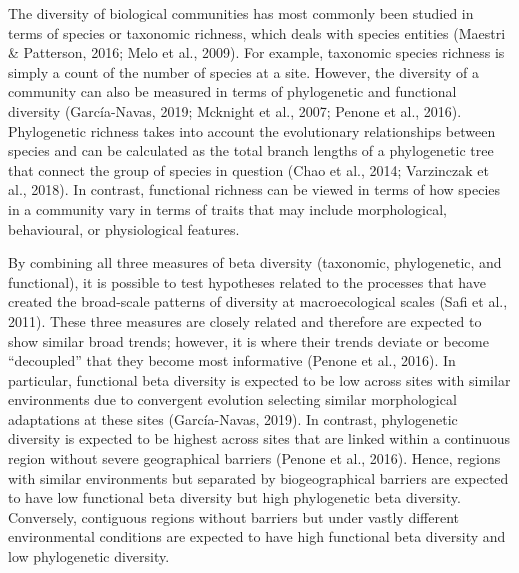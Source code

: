 \documentclass{article}
\begin{document}
\vspace{5mm}

The diversity of biological communities has most commonly been studied in terms of species or taxonomic richness, which deals with species entities (Maestri \& Patterson, 2016; Melo et al., 2009). For example, taxonomic species richness is simply a count of the number of species at a site. However, the diversity of a community can also be measured in terms of phylogenetic and functional diversity (García-Navas, 2019; Mcknight et al., 2007; Penone et al., 2016). Phylogenetic richness takes into account the evolutionary relationships between species and can be calculated as the total branch lengths of a phylogenetic tree that connect the group of species in question (Chao et al., 2014; Varzinczak et al., 2018).
In contrast, functional richness can be viewed in terms of how species in a community vary in terms of traits that may include morphological, behavioural, or physiological features. 

\vspace{5mm}

By combining all three measures of beta diversity (taxonomic, phylogenetic, and functional), it is possible to test hypotheses related to the processes that have created the broad-scale patterns of diversity at macroecological scales (Safi et al., 2011). These three measures are closely related and therefore are expected to show similar broad trends; however, it is where their trends deviate or become “decoupled” that they become most informative (Penone et al., 2016). In particular, functional beta diversity is expected to be low across sites with similar environments due to convergent evolution selecting similar morphological adaptations at these sites (García-Navas, 2019). In contrast, phylogenetic diversity is expected to be highest across sites that are linked within a continuous region without severe geographical barriers (Penone et al., 2016). Hence, regions with similar environments but separated by biogeographical barriers are expected to have low functional beta diversity but high phylogenetic beta diversity. Conversely, contiguous regions without barriers but under vastly different environmental conditions are expected to have high functional beta diversity and low phylogenetic diversity. 
\end{document}
